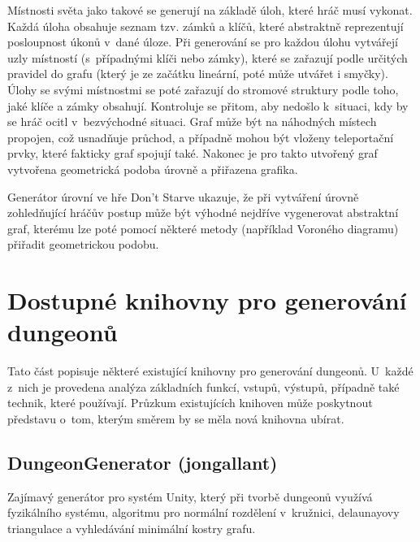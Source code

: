 Místnosti světa jako takové se generují na základě úloh, které hráč musí vykonat.
Každá úloha obsahuje seznam tzv. zámků a klíčů, které abstraktně reprezentují posloupnost úkonů v~dané úloze.
Při generování se pro každou úlohu vytvářejí uzly místností (s~případnými klíči nebo zámky), které se zařazují podle určitých pravidel do grafu (který je ze začátku lineární, poté může utvářet i smyčky).
Úlohy se svými místnostmi se poté zařazují do stromové struktury podle toho, jaké klíče a zámky obsahují.
Kontroluje se přitom, aby nedošlo k~situaci, kdy by se hráč ocitl v~bezvýchodné situaci.
Graf může být na náhodných místech propojen, což usnadňuje průchod, a případně mohou být vloženy teleportační prvky, které fakticky graf spojují také.
Nakonec je pro takto utvořený graf vytvořena geometrická podoba úrovně a přiřazena grafika\cite{lit:dont_starve}.
\par
Generátor úrovní ve hře Don't Starve ukazuje, že při vytváření úrovně zohledňující hráčův postup může být výhodné nejdříve vygenerovat abstraktní graf, kterému lze poté pomocí některé metody (například Voroného diagramu) přiřadit geometrickou podobu.


\section{Dostupné knihovny pro generování dungeonů}
\label{sec:dostupne_knihovny}


Tato část popisuje některé existující knihovny pro generování dungeonů.
U~každé z~nich je provedena analýza základních funkcí, vstupů, výstupů, případně také technik, které používají.
Průzkum existujících knihoven může poskytnout představu o~tom, kterým směrem by se měla nová knihovna ubírat.


\subsection{DungeonGenerator (jongallant)}
\label{ssec:dungeongenerator_jongallant}


Zajímavý generátor pro systém Unity, který při tvorbě dungeonů využívá fyzikálního systému, algoritmu pro normální rozdělení v~kružnici, delaunayovy triangulace a vyhledávání minimální kostry grafu\cite{lit:lib_adn}.\medskip

